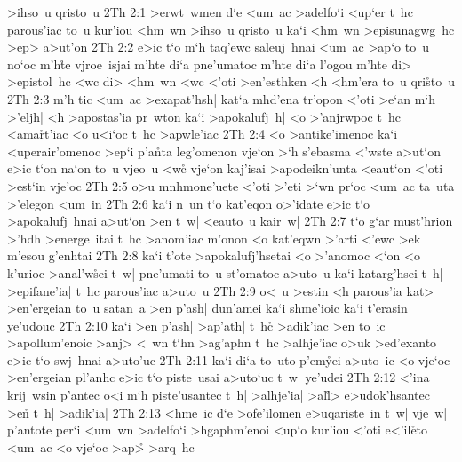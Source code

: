 >ihso~u
qristo~u\bibvsend
\vs 2Th 2:1
>erwt~wmen
d`e
<um~ac
>adelfo`i
<up`er
t~hc
parous'iac
to~u
kur'iou
<hm~wn
>ihso~u
qristo~u
ka`i
<hm~wn
>episunagwg~hc
>ep>
a>ut'on\bibvsend
\vs 2Th 2:2
e>ic
t`o
m`h
taq'ewc
saleuj~hnai
<um~ac
>ap`o
to~u
no`oc
m'h\r{t}e
vjroe~isjai
m'hte
di`a
pne'umatoc
m'hte
di`a
l'ogou
m'hte
di>
>epistol~hc
<wc
di>
<hm~wn
<wc
<'oti
>en'esthken
<h
<hm'era
to~u
qri\r{s}to~u\bibvsend
{}
\vs 2Th 2:3
m'h
tic
<um~ac
>exapat'hsh|
kat`a
mhd'ena
tr'opon
<'oti
>e`an
m`h
>'eljh|
<h
>apostas'ia
pr~wton
ka`i
>apokalufj~h|
<o
>'anjrwpoc
t~hc
<ama\r{r}t'iac
<o
u<i`oc
t~hc
>apwle'iac\bibvsend
\vs 2Th 2:4
<o
>antike'imenoc
ka`i
<uperair'omenoc
>ep`i
p'a\r{n}ta
leg'omenon
vje`on
>`h
s'ebasma
<'wste
a>ut`on
e>ic
t`on
na`on
to~u
vjeo~u
<wc\r{}
vje`on
kaj'isai
>apodeikn'unta
<eaut`on
<'oti
>est`in
vje'oc\bibvsend
\vs 2Th 2:5
o>u
mnhmone'uete
<'oti
>'eti
>`wn
pr`oc
<um~ac
ta~uta
>'elegon
<um~in\bibvsend
\vs 2Th 2:6
ka`i
n~un
t`o
kat'eqon
o>'idate
e>ic
t`o
>apokalufj~hnai
a>ut`on
>en
t~w|
<eauto~u
kair~w|\bibvsend
\vs 2Th 2:7
t`o
g`ar
must'hrion
>'hdh
>energe~itai
t~hc
>anom'iac
m'onon
<o
kat'eqwn
>'arti
<'ewc
>ek
m'esou
g'enhtai\bibvsend
\vs 2Th 2:8
ka`i
t'ote
>apokalufj'hsetai
<o
>'anomoc
<`on
<o
k'urioc
>anal'w\r{s}ei
t~w|
pne'umati
to~u
st'omatoc
a>uto~u
ka`i
katarg'hsei
t~h|
>epifane'ia|
t~hc
parous'iac
a>uto~u\bibvsend
\vs 2Th 2:9
o<~u
>estin
<h
parous'ia
kat>
>en'ergeian
to~u
satan~a
>en
p'ash|
dun'amei
ka`i
shme'ioic
ka`i
t'erasin
ye'udouc\bibvsend
\vs 2Th 2:10
ka`i
>en
p'ash|
>ap'ath|
t~hc\r{}
>adik'iac
>en
to~ic
>apollum'enoic
>anj>
<~wn
t`hn
>ag'aphn
t~hc
>alhje'iac
o>uk
>ed'exanto
e>ic
t`o
swj~hnai
a>uto'uc\bibvsend
\vs 2Th 2:11
ka`i
di`a
to~uto
p'em\r{y}ei
a>uto~ic
<o
vje`oc
>en'ergeian
pl'anhc
e>ic
t`o
piste~usai
a>uto`uc
t~w|
ye'udei\bibvsend
\vs 2Th 2:12
<'ina
krij~wsin
p'antec
o<i
m`h
piste'usantec
t~h|
>alhje'ia|
>al\r{l}>
e>udok'hsantec
>e\r{n}
t~h|
>adik'ia|\bibvsend
\vs 2Th 2:13
<hme~ic
d`e
>ofe'ilomen
e>uqariste~in
t~w|
vje~w|
p'antote
per`i
<um~wn
>adelfo`i
>hgaphm'enoi
<up`o
kur'iou
<'oti
e<'il\r{e}to
<um~ac
<o
vje`oc
>ap>\r{}
>arq~hc
